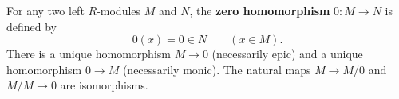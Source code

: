 For any two left $R$-modules $M$ and $N$, the \textbf{zero homomorphism} $0: M \to N$ is defined by
$$0(x) = 0 \in N \qquad (x \in M).$$
There is a unique homomorphism $M \to 0$ (necessarily epic) and a unique homomorphism $0 \to M$ (necessarily monic). The natural maps $M \to M/0$ and $M/M \to 0$ are isomorphisms.
